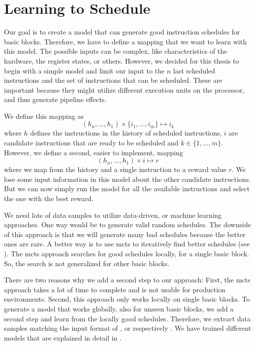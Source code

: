 \section{Learning to Schedule}
\label{sec:approach:ml}
Our goal is to create a model that can generate good instruction schedules for basic blocks.
Therefore, we have to define a mapping that we want to learn with this model.
The possible inputs can be complex, like characteristics of the hardware, the register states, or others.
However, we decided for this thesis to begin with a simple model and limit our input to the $n$ last scheduled instructions and the set of instructions that can be scheduled.
These are important because they might utilize different execution units on the processor, and thus generate pipeline effects.

We define this mapping as
\begin{equation}
    (h_n, \ldots, h_1) \times \{i_1, \ldots, i_m\} \mapsto i_k
    \label{eqn:mlmapping1}
\end{equation}
where $h$ defines the instructions in the history of scheduled instructions, $i$ are candidate instructions that are ready to be scheduled and $k \in \{1, \ldots, m\}$.
However, we define a second, easier to implement, mapping
\begin{equation}
    (h_n, \ldots, h_1) \times i \mapsto r
    \label{eqn:mlmapping2}
\end{equation}
where we map from the history and a single instruction to a reward value $r$.
We lose some input information in this model about the other candidate instructions.
But we can now simply run the model for all the available instructions and select the one with the best reward.

We need lots of data samples to utilize data-driven, or machine learning approaches.
One way would be to generate valid random schedules.
The downside of this approach is that we will generate many bad schedules because the better ones are rare.
A better way is to use \ac{mcts} to iteratively find better schedules (see ).
The \ac{mcts} approach searches for good schedules locally, \ie for a single basic block.
So, the search is not generalized for other basic blocks.

There are two reasons why we add a second step to our approach:
First, the \ac{mcts} approach takes a lot of time to complete and is not usable for production environments.
Second, this approach only works locally on single basic blocks.
To generate a model that works globally, \ie also for unseen basic blocks, we add a second step and learn from the locally good schedules.
Therefore, we extract data samples matching the input format of , or respectively .
We have trained different models that are explained in detail in .

